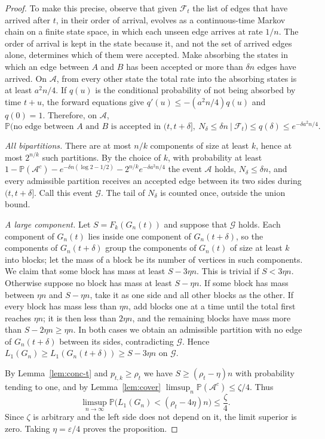 \documentclass[11pt]{amsart}
\theoremstyle{remark}
\numberwithin{equation}{section}
\newcommand{\Pp}{\mathbb P}
\newcommand{\1}{\mathbf 1}
\begin{document}
\begin{proof}
To make this precise, observe that given $\mathcal F_t$ the list of edges that have arrived after $t$, in their order of arrival, evolves as a continuous-time Markov chain on a finite state space, in which each unseen edge arrives at rate $1/n$. The order of arrival is kept in the state because it, and not the set of arrived edges alone, determines which of them were accepted. Make absorbing the states in which an edge between $A$ and $B$ has been accepted or more than $\delta n$ edges have arrived. On $\mathcal A$, from every other state the total rate into the absorbing states is at least $a^2n/4$. If $q(u)$ is the conditional probability of not being absorbed by time $t+u$, the forward equations give $q'(u)\le-(a^2n/4)q(u)$ and $q(0)=1$. Therefore, on $\mathcal A$,
\[
\Pp\bigl(\text{no edge between }A\text{ and }B\text{ is accepted in }(t,t+\delta],\ N_\delta\le\delta n\ \big|\ \mathcal F_t\bigr)\le q(\delta)\le e^{-\delta a^2n/4}.
\]

\emph{All bipartitions.} There are at most $n/k$ components of size at least $k$, hence at most $2^{n/k}$ such partitions. By the choice of $k$, with probability at least $1-\Pp(\mathcal A^c)-e^{-\delta n(\log2-1/2)}-2^{n/k}e^{-\delta a^2n/4}$ the event $\mathcal A$ holds, $N_\delta\le\delta n$, and every admissible partition receives an accepted edge between its two sides during $(t,t+\delta]$. Call this event $\mathcal G$. The tail of $N_\delta$ is counted once, outside the union bound.

\emph{A large component.} Let $S=F_k(G_n(t))$ and suppose that $\mathcal G$ holds. Each component of $G_n(t)$ lies inside one component of $G_n(t+\delta)$, so the components of $G_n(t+\delta)$ group the components of $G_n(t)$ of size at least $k$ into blocks; let the mass of a block be its number of vertices in such components. We claim that some block has mass at least $S-3\eta n$. This is trivial if $S<3\eta n$. Otherwise suppose no block has mass at least $S-\eta n$. If some block has mass between $\eta n$ and $S-\eta n$, take it as one side and all other blocks as the other. If every block has mass less than $\eta n$, add blocks one at a time until the total first reaches $\eta n$; it is then less than $2\eta n$, and the remaining blocks have mass more than $S-2\eta n\ge\eta n$. In both cases we obtain an admissible partition with no edge of $G_n(t+\delta)$ between its sides, contradicting $\mathcal G$. Hence $L_1(G_n)\ge L_1(G_n(t+\delta))\ge S-3\eta n$ on $\mathcal G$.

By Lemma~\ref{lem:conc-t} and $p_{t,k}\ge\rho_t$ we have $S\ge(\rho_t-\eta)n$ with probability tending to one, and by Lemma~\ref{lem:cover} $\limsup_n\Pp(\mathcal A^c)\le\zeta/4$. Thus
\[
\limsup_{n\to\infty}\Pp\bigl(L_1(G_n)<(\rho_t-4\eta)n\bigr)\le\frac\zeta4 .
\]
Since $\zeta$ is arbitrary and the left side does not depend on it, the limit superior is zero. Taking $\eta=\varepsilon/4$ proves the proposition.
\end{proof}
\end{document}
